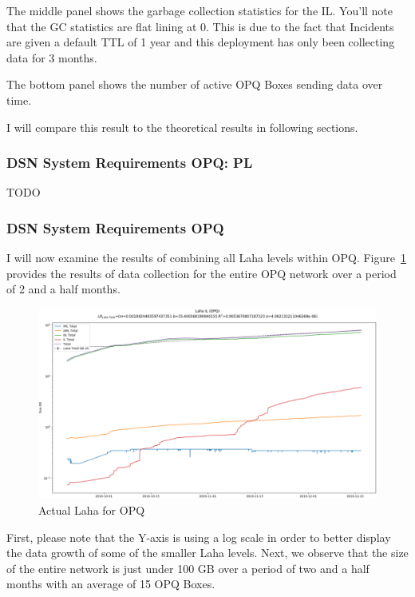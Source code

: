 The middle panel shows the garbage collection statistics for the IL. You'll note that the GC statistics are flat lining at 0. This is due to the fact that Incidents are given a default TTL of 1 year and this deployment has only been collecting data for 3 months.

The bottom panel shows the number of active OPQ Boxes sending data over time.

I will compare this result to the theoretical results in following sections.

\subsubsection{DSN System Requirements OPQ: PL}

TODO

\subsubsection{DSN System Requirements OPQ}

I will now examine the results of combining all Laha levels within OPQ. Figure~\ref{fig:actual_laha_opq} provides the results of data collection for the entire OPQ network over a period of 2 and a half months.

\begin{figure}[H]
    \centering
    \includegraphics[width=\linewidth]{figures/actual_laha_opq.png}
    \caption{Actual Laha for OPQ}
    \label{fig:actual_laha_opq}
\end{figure}

First, please note that the Y-axis is using a log scale in order to better display the data growth of some of the smaller Laha levels. Next, we observe that the size of the entire network is just under 100 GB over a period of two and a half months with an average of 15 OPQ Boxes.

